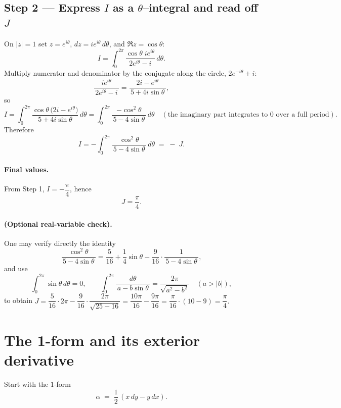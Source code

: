 \documentclass[11pt]{article}
\begin{document}
\subsection*{Step 2 — Express $I$ as a $\theta$–integral and read off $J$}
On $|z|=1$ set $z=e^{i\theta}$, $dz=i e^{i\theta}\,d\theta$, and $\Re z=\cos\theta$:
\[
I=\int_{0}^{2\pi} \frac{\cos\theta\; i e^{i\theta}}{\,2e^{i\theta}-i\,}\,d\theta.
\]
Multiply numerator and denominator by the conjugate along the circle, $2e^{-i\theta}+i$:
\[
\frac{i e^{i\theta}}{\,2e^{i\theta}-i\,}
=
\frac{2i - e^{i\theta}}{\,5+4i\sin\theta\,},
\]
so
\[
I
=
\int_{0}^{2\pi}\frac{\cos\theta\,\bigl(2i-e^{i\theta}\bigr)}{\,5+4i\sin\theta\,}\,d\theta
=
\int_{0}^{2\pi}\frac{-\cos^{2}\theta}{\,5-4\sin\theta\,}\,d\theta
\quad(\text{the imaginary part integrates to }0 \text{ over a full period}).
\]
Therefore
\[
I=-\int_{0}^{2\pi}\frac{\cos^{2}\theta}{\,5-4\sin\theta\,}\,d\theta
\;=\;
-\;J.
\]

\paragraph{Final values.}
From Step 1, $I=-\dfrac{\pi}{4}$, hence
\[
\boxed{J=\frac{\pi}{4}}.
\]

\paragraph{(Optional real-variable check).}
One may verify directly the identity
\[
\frac{\cos^{2}\theta}{\,5-4\sin\theta\,}
=
\frac{5}{16}
+\frac{1}{4}\sin\theta
-\frac{9}{16}\cdot \frac{1}{\,5-4\sin\theta\,},
\]
and use
\[
\int_{0}^{2\pi}\!\sin\theta\,d\theta=0,
\qquad
\int_{0}^{2\pi}\frac{d\theta}{\,a-b\sin\theta\,}
=\frac{2\pi}{\sqrt{a^{2}-b^{2}}}\quad(a>|b|),
\]
to obtain
\(
J=\dfrac{5}{16}\cdot 2\pi - \dfrac{9}{16}\cdot \dfrac{2\pi}{\sqrt{25-16}}
=\dfrac{10\pi}{16}-\dfrac{9\pi}{16}
=\dfrac{\pi}{16}
\cdot (10-9)
=\dfrac{\pi}{4}.
\)

\section*{The 1-form and its exterior derivative}

Start with the $1$-form
\[
\alpha \;=\; \frac12\,(x\,dy - y\,dx).
\]
\end{document}
